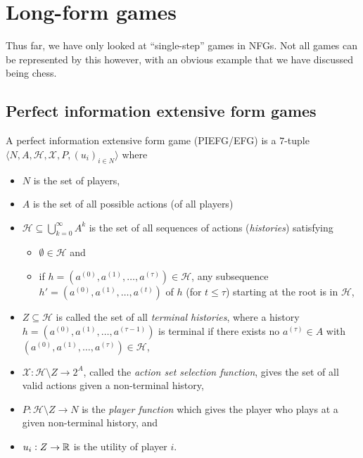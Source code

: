 
\section{Long-form games}

Thus far, we have only looked at ``single-step'' games in NFGs. Not all games can be represented by this however, with an obvious example that we have discussed being chess.

\subsection{Perfect information extensive form games}

	\begin{fdef}
		A perfect information extensive form game (PIEFG/EFG) is a $7$-tuple $\langle N,A,\mathcal{H},\mathcal{X},P,(u_i)_{i\in N}\rangle$ where
		\begin{itemize}
			\item $N$ is the set of players,
			\item $A$ is the set of all possible actions (of all players)
			\item $\mathcal{H} \subseteq \bigcup_{k=0}^{\infty} A^k$ is the set of all sequences of actions (\emph{histories}) satisfying
			\begin{itemize}
				\item $\emptyset \in \mathcal{H}$ and
				\item if $h = (a^{(0)},a^{(1)},\ldots,a^{(\tau)}) \in \mathcal{H}$, any subsequence $h' = (a^{(0)},a^{(1)},\ldots,a^{(t)})$ of $h$ (for $t \le \tau$) starting at the root is in $\mathcal{H}$,
			\end{itemize}
			\item $Z \subseteq \mathcal{H}$ is called the set of all \emph{terminal histories}, where a history $h = (a^{(0)},a^{(1)},\ldots,a^{(\tau-1)})$ is terminal if there exists no $a^{(\tau)} \in A$ with $(a^{(0)},a^{(1)},\ldots,a^{(\tau)}) \in \mathcal{H}$,
			\item $\mathcal{X} : \mathcal{H} \setminus Z \to 2^A$, called the \emph{action set selection function}, gives the set of all valid actions given a non-terminal history,
			\item $P : \mathcal{H}\setminus Z \to N$ is the \emph{player function} which gives the player who plays at a given non-terminal history, and
			\item $u_i : Z \to \mathbb{R}$ is the utility of player $i$.
		\end{itemize}
	\end{fdef}

